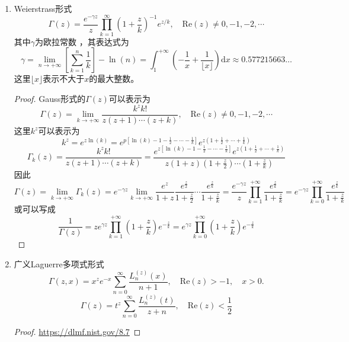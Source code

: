 \begin{property}
\begin{enumerate}[noitemsep]
\begin{enumerate}[noitemsep]
			\item Weierstrass形式
			\begin{equation}
			\Gamma \left(z\right)={\frac {e^{-\gamma z}}{z}}\prod _{k=1}^{\infty }{\left(1+{\frac {z}{k}}\right)^{-1}e^{z/k}},\quad \mathrm{Re}(z) \ne 0,-1,-2,\cdots
			\end{equation}
			其中$\gamma $为欧拉常数 \cite{Wiki-Euler-Mascheroni-constant} ，其表达式为
			$$ \gamma =  \lim _{n \rightarrow +\infty} {\left[\sum_{k=1}^n {\frac{1}{k}} \right]-\ln \left(n\right)}  = \int _{1}^{+\infty }\left(-{\frac {1}{x}}+{\frac {1}{\lfloor x\rfloor }}\right)\mathrm{d}x \approx 0.577215663\dots$$
			这里$\lfloor x\rfloor$表示不大于$x$的最大整数。
			\begin{proof}
				Gauss形式的$\Gamma\left(z\right)$可以表示为
				$$\Gamma\left(z\right) = \lim _{k \rightarrow +\infty} {\frac{k^z k!}{z\left(z+1\right)\cdots\left(z+k \right)}},\quad \mathrm{Re}(z) \ne 0,-1,-2,\cdots$$		 		
				这里$k^z$可以表示为$$
				k^z = e^{z\ln \left(k\right)} =e^{p\left[\ln\left(k\right)-1-\frac{1}{2}-\cdots-\frac{1}{k}\right]}e^{z \left(1+\frac{1}{2}+\cdots+\frac{1}{k} \right)}
				$$
				$$
				\Gamma_k\left(z\right) = \frac{k^z k!}{z\left(z+1\right)\cdots\left(z+k \right)} = \frac{e^{z\left[\ln\left(k\right)-1-\frac{1}{2}-\cdots-\frac{1}{k}\right]}e^{z \left(1+\frac{1}{2}+\cdots+\frac{1}{k}\right)}}{z\left(1+z \right)\left(1+\frac{z}{2}\right)\cdots \left(1+\frac{z}{k}\right)}
				$$
				因此$$
				\Gamma\left(z\right) = \lim _{k \rightarrow +\infty}\Gamma_k\left(z\right) = e^{-\gamma z} \lim _{k \rightarrow +\infty}\frac{e^z}{1+z} \frac{e^{\frac{z}{2}}}{1+\frac{z}{2}}\cdots \frac{e^{\frac{z}{k}}}{1+\frac{z}{k}} =  \frac{e^{-\gamma z}}{z}  \prod_{k=1}^{+\infty}\frac{e^{\frac{z}{k}}}{1+\frac{z}{k}} = e^{-\gamma z}  \prod_{k=0}^{+\infty}\frac{e^{\frac{z}{k}}}{1+\frac{z}{k}}   $$
				或可以写成$$\frac{1}{\Gamma\left(z\right)} =  ze^{\gamma z}\prod_{k=1}^{+\infty}\left(1+\frac{z}{k}\right)e^{-\frac{z}{k}} =e^{\gamma z}\prod_{k=0}^{+\infty}\left(1+\frac{z}{k}\right)e^{-\frac{z}{k}}$$	
			\end{proof}
			
			\item 广义Laguerre多项式\cite{Wiki-Laguerre-Polynomials}形式 
			\begin{equation}
			\Gamma \left(z,x\right)=x^{z}e^{-x}\sum _{n=0}^{\infty }{\frac {L_{n}^{\left(z\right)}\left(x\right)}{n+1}},\quad \mathrm{Re}\left(z\right)>-1,\quad x>0.
			\end{equation}
			\begin{equation}
			\Gamma \left(z\right)=t^{z}\sum _{n=0}^{\infty }{\frac {L_{n}^{\left(z\right)}\left(t\right)}{z+n}},\quad \mathrm{Re}\left(z\right)<\frac{1}{2}
			\end{equation}
			\begin{proof}
				 \url{https://dlmf.nist.gov/8.7}
			\end{proof}
		\end{enumerate}
		

\end{enumerate}
\end{property}
